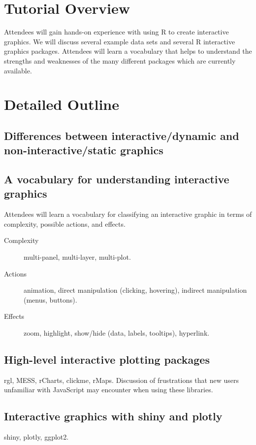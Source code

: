 \documentclass[11pt]{article}
\begin{document}
\section*{Tutorial Overview}

Attendees will gain hands-on experience with using R to create
interactive graphics. We will discuss several example data sets and
several R interactive graphics packages. Attendees will learn a
vocabulary that helps to understand the strengths and weaknesses of
the many different packages which are currently available.

\section*{Detailed Outline}
\label{sec:orgheadline10}

\subsection*{Differences between interactive/dynamic and non-interactive/static graphics}

\subsection*{A vocabulary for understanding interactive graphics}
\label{sec:orgheadline7}
Attendees will learn a vocabulary for classifying an interactive
graphic in terms of complexity, possible actions, and effects.
\begin{description}
\item[Complexity] multi-panel, multi-layer, multi-plot.
\item[Actions] animation, direct manipulation (clicking, hovering), indirect manipulation
  (menus, buttons).
\item[Effects] zoom, highlight, show/hide (data, labels, tooltips),
  hyperlink.
\end{description}

\subsection*{High-level interactive plotting packages}
rgl, MESS, rCharts, clickme, rMaps. Discussion of frustrations that
new users unfamiliar with JavaScript may encounter when using these
libraries.

\subsection*{Interactive graphics with shiny and plotly}
shiny, plotly, ggplot2.
\end{document}
